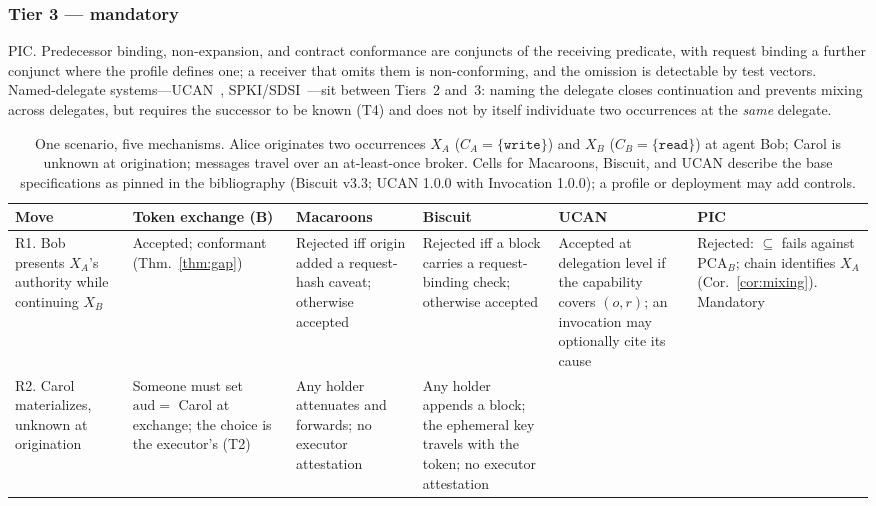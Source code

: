 \documentclass[conference]{IEEEtran}
\newcommand{\aud}{\mathrm{aud}}
\begin{document}
\subsubsection*{Tier 3 --- mandatory}
PIC. Predecessor binding, non-expansion, and contract conformance are conjuncts of the receiving predicate, with request binding a further conjunct where the profile defines one; a receiver that omits them is non-conforming, and the omission is detectable by test vectors. Named-delegate systems---UCAN~\cite{ucan}, SPKI/SDSI~\cite{rfc2693}---sit between Tiers~2 and~3: naming the delegate closes continuation and prevents mixing across delegates, but requires the successor to be known (T4) and does not by itself individuate two occurrences at the \emph{same} delegate.

\begin{table}[t]
\centering
\caption{One scenario, five mechanisms. Alice originates two occurrences $X_A$ ($C_A=\{\texttt{write}\}$) and $X_B$ ($C_B=\{\texttt{read}\}$) at agent Bob; Carol is unknown at origination; messages travel over an at-least-once broker. Cells for Macaroons, Biscuit, and UCAN describe the base specifications as pinned in the bibliography (Biscuit v3.3; UCAN 1.0.0 with Invocation 1.0.0); a profile or deployment may add controls.}
\label{tab:paripasso}
\small
\begin{tabular}{@{}>{\raggedright\arraybackslash}p{2.3cm}>{\raggedright\arraybackslash}p{2.75cm}>{\raggedright\arraybackslash}p{2.75cm}>{\raggedright\arraybackslash}p{2.75cm}>{\raggedright\arraybackslash}p{2.75cm}>{\raggedright\arraybackslash}p{2.85cm}@{}}
\toprule
\textbf{Move} & \textbf{Token exchange (B)} & \textbf{Macaroons} & \textbf{Biscuit} & \textbf{UCAN} & \textbf{PIC} \\
\midrule
R1. Bob presents $X_A$'s authority while continuing $X_B$ &
Accepted; conformant (Thm.~\ref{thm:gap}) &
Rejected iff origin added a request-hash caveat; otherwise accepted &
Rejected iff a block carries a request-binding check; otherwise accepted &
Accepted at delegation level if the capability covers $(o,r)$; an invocation may optionally cite its cause &
Rejected: $\subseteq$ fails against $\mathrm{PCA}_B$; chain identifies $X_A$ (Cor.~\ref{cor:mixing}). Mandatory \\
\addlinespace
R2. Carol materializes, unknown at origination &
Someone must set $\aud=$ Carol at exchange; the choice is the executor's (T2) &
Any holder attenuates and forwards; no executor attestation &
Any holder appends a block; the ephemeral key travels with the token; no executor attestation &

\end{tabular}
\end{table}
\end{document}
